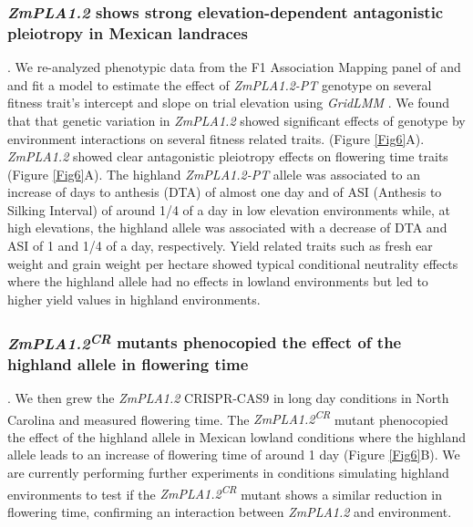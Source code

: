 \documentclass[9pt,twocolumn,twoside]{BioRxiv}
\begin{document}
\subsubsection{\textit{ZmPLA1.2} shows strong elevation-dependent antagonistic pleiotropy in Mexican landraces}. 
We re-analyzed phenotypic data from the F1 Association Mapping panel of \cite{Romero_Navarro2017-cn} and \cite{Gates2019-xu} and fit a model to estimate the effect of \textit{ZmPLA1.2-PT} genotype on several fitness trait's intercept and slope on trial elevation using \textit{GridLMM} \cite{Runcie2019-Gr}. 
We found that that genetic variation in \textit{ZmPLA1.2} showed significant effects of genotype by environment interactions on several fitness related traits. (Figure \ref{Fig6}A). 
\textit{ZmPLA1.2} showed clear antagonistic pleiotropy effects on flowering time traits (Figure \ref{Fig6}A). 
The highland \textit{ZmPLA1.2-PT} allele was associated to an increase of days to anthesis (DTA) of almost one day and of ASI (Anthesis to Silking Interval) of around 1/4 of a day in low elevation environments while, at high elevations, the highland allele was associated with a decrease of DTA and ASI of 1 and 1/4 of a day, respectively.
Yield related traits such as fresh ear weight and grain weight per hectare showed typical conditional neutrality effects where the highland allele had no effects in lowland environments but led to higher yield values in highland environments.
\subsubsection{\textit{ZmPLA1.2\textsuperscript{CR}} mutants phenocopied the effect of the highland allele in flowering time}.
We then grew the \textit{ZmPLA1.2} CRISPR-CAS9 in long day conditions in North Carolina and measured flowering time. 
The \textit{ZmPLA1.2\textsuperscript{CR}} mutant phenocopied the effect of the highland allele in Mexican lowland conditions where the highland allele leads to an increase of flowering time of around 1 day (Figure \ref{Fig6}B). 
We are currently performing further experiments in conditions simulating highland environments to test if the \textit{ZmPLA1.2\textsuperscript{CR}} mutant shows a similar reduction in flowering time, confirming an interaction between \textit{ZmPLA1.2} and environment.
\end{document}
